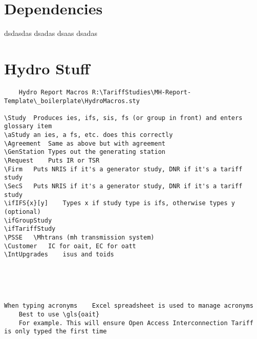 \documentclass{corpboreport}
\begin{document}
\section{Dependencies}
dsdasdas dsadas
dsaas dsadas

\PrintEndOfDocument*

\section{Hydro Stuff}

\begin{lstlisting}
	Hydro Report Macros	R:\TariffStudies\MH-Report-Template\_boilerplate\HydroMacros.sty

\Study	Produces ies, ifs, sis, fs (or group in front) and enters glossary item
\aStudy	an ies, a fs, etc. does this correctly
\Agreement	Same as above but with agreement
\GenStation	Types out the generating station
\Request	Puts IR or TSR
\Firm	Puts NRIS if it's a generator study, DNR if it's a tariff study
\SecS	Puts NRIS if it's a generator study, DNR if it's a tariff study
\ifIFS{x}[y]	Types x if study type is ifs, otherwise types y (optional)
\ifGroupStudy
\ifTariffStudy
\PSSE	\Mhtrans (mh transmission system)
\Customer	IC for oait, EC for oatt
\IntUpgrades	isus and toids





When typing acronyms	Excel spreadsheet is used to manage acronyms
	Best to use \gls{oait}
	For example. This will ensure Open Access Interconnection Tariff is only typed the first time

\end{lstlisting}
\end{document}

